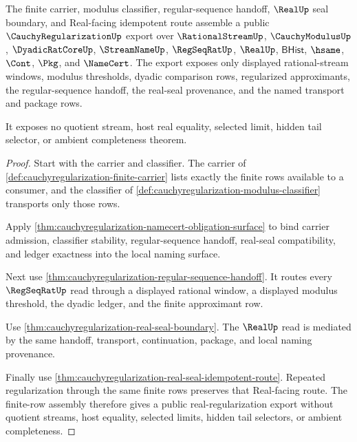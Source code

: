 \begin{theorem}
\label{thm:cauchyregularization-public-real-regularization-export}
The finite carrier, modulus classifier, regular-sequence handoff, $\RealUp$
seal boundary, and Real-facing idempotent route assemble a public
$\CauchyRegularizationUp$ export over $\RationalStreamUp$,
$\CauchyModulusUp$, $\DyadicRatCoreUp$, $\StreamNameUp$, $\RegSeqRatUp$,
$\RealUp$, $\mathsf{BHist}$, $\hsame$, $\Cont$, $\Pkg$, and $\NameCert$.
The export exposes only displayed rational-stream windows, modulus
thresholds, dyadic comparison rows, regularized approximants, the
regular-sequence handoff, the real-seal provenance, and the named transport
and package rows.

It exposes no quotient stream, host real equality, selected limit, hidden tail selector, or ambient completeness theorem.
\end{theorem}
\begin{proof}
Start with the carrier and classifier. The carrier of \autoref{def:cauchyregularization-finite-carrier} lists exactly the finite rows available to a consumer, and the classifier of \autoref{def:cauchyregularization-modulus-classifier} transports only those rows.

Apply \autoref{thm:cauchyregularization-namecert-obligation-surface} to bind carrier admission, classifier stability, regular-sequence handoff, real-seal compatibility, and ledger exactness into the local naming surface.

Next use \autoref{thm:cauchyregularization-regular-sequence-handoff}. It routes every $\RegSeqRatUp$ read through a displayed rational window, a displayed modulus threshold, the dyadic ledger, and the finite approximant row.

Use \autoref{thm:cauchyregularization-real-seal-boundary}. The $\RealUp$
read is mediated by the same handoff, transport, continuation, package, and
local naming provenance.

Finally use
\autoref{thm:cauchyregularization-real-seal-idempotent-route}. Repeated
regularization through the same finite rows preserves that Real-facing route.
The finite-row assembly therefore gives a public real-regularization export
without quotient streams, host equality, selected limits, hidden tail
selectors, or ambient completeness.
\end{proof}


